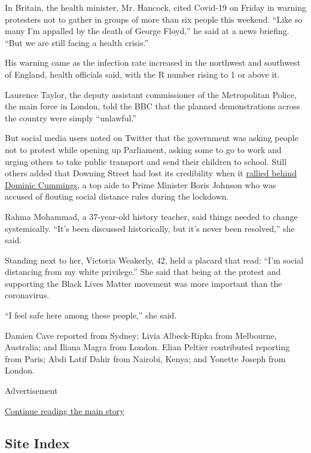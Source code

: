 In Britain, the health minister, Mr. Hancock, cited Covid-19 on Friday
in warning protesters not to gather in groups of more than six people
this weekend. ``Like so many I'm appalled by the death of George
Floyd,'' he said at a news briefing. ``But we are still facing a health
crisis.''

His warning came as the infection rate increased in the northwest and
southwest of England, health officials said, with the R number rising to
1 or above it.

Laurence Taylor, the deputy assistant commissioner of the Metropolitan
Police, the main force in London, told the BBC that the planned
demonstrations across the country were simply ``unlawful.''

But social media users noted on Twitter that the government was asking
people not to protest while opening up Parliament, asking some to go to
work and urging others to take public transport and send their children
to school. Still others added that Downing Street had lost its
credibility when it
\href{https://www.nytimes.com/2020/05/26/world/europe/boris-johnson-dominic-cummings-uk.html}{rallied
behind Dominic Cummings}, a top aide to Prime Minister Boris Johnson who
was accused of flouting social distance rules during the lockdown.

Rahma Mohammad, a 37-year-old history teacher, said things needed to
change systemically. ``It's been discussed historically, but it's never
been resolved,'' she said.

Standing next to her, Victoria Weakerly, 42, held a placard that read:
``I'm social distancing from my white privilege.'' She said that being
at the protest and supporting the Black Lives Matter movement was more
important than the coronavirus.

``I feel safe here among these people,'' she said.

Damien Cave reported from Sydney; Livia Albeck-Ripka from Melbourne,
Australia; and Iliana Magra from London. Elian Peltier contributed
reporting from Paris; Abdi Latif Dahir from Nairobi, Kenya; and Yonette
Joseph from London.

Advertisement

\protect\hyperlink{after-bottom}{Continue reading the main story}

\hypertarget{site-index}{%
\subsection{Site Index}\label{site-index}}

